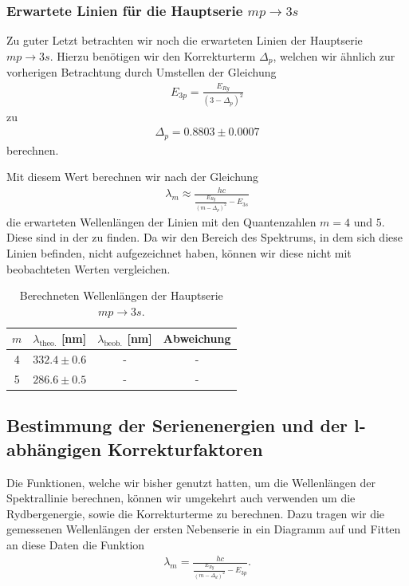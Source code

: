 \subsubsection*{Erwartete Linien für die Hauptserie $mp \to 3s$}

Zu guter Letzt betrachten wir noch die erwarteten Linien der Hauptserie $mp \to 3s$. Hierzu benötigen wir den Korrekturterm $\Delta_p$, welchen wir ähnlich zur vorherigen Betrachtung durch Umstellen der Gleichung
\begin{align}
  E_{3p} = \frac{E_{Ry}}{(3 - \Delta_p)^2}
\end{align}
zu
\begin{align}
  \Delta_p = 0.8803 \pm 0.0007
\end{align}
berechnen.

Mit diesem Wert berechnen wir nach der Gleichung
\begin{align}
  \lambda_m \approx \frac{hc}{\frac{E_{Ry}}{(m - \Delta_p)^2} - E_{3s}}
\end{align}
die erwarteten Wellenlängen der Linien mit den Quantenzahlen $m = 4$ und $5$. Diese sind in der  zu finden. Da wir den Bereich des Spektrums, in dem sich diese Linien befinden, nicht aufgezeichnet haben, können wir diese nicht mit beobachteten Werten vergleichen.

\begin{table}[H]
  \centering
  \caption{Berechneten Wellenlängen der Hauptserie $mp \to 3s$.}
  \vspace*{0.5em}
  \begin{tabular}{c c c c}
      \hline
      $m$ & $\lambda_{\text{theo.}}$ [nm] & $\lambda_{\text{beob.}}$ [nm] & Abweichung \\
      \hline
      4  & $332.4 \pm 0.6$ & -     & -     \\
      5  & $286.6 \pm 0.5$  & - & - \\
      \hline
  \end{tabular}
  \label{tab:wellenlaengen_hs}
\end{table}

\subsection{Bestimmung der Serienenergien und der l-abhängigen Korrekturfaktoren}

Die Funktionen, welche wir bisher genutzt hatten, um die Wellenlängen der Spektrallinie berechnen, können wir umgekehrt auch verwenden um die Rydbergenergie, sowie die Korrekturterme zu berechnen. Dazu tragen wir die gemessenen Wellenlängen der ersten Nebenserie in ein Diagramm auf und Fitten an diese Daten die Funktion
\begin{align}
  \lambda_m = \frac{hc}{\frac{E_{Ry}}{(m-\Delta_d)^2} - E_{3p}}.
\end{align}

